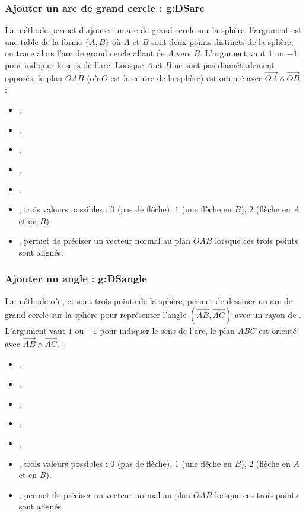 \subsubsection{Ajouter un arc de grand cercle : g:DSarc}

La méthode  permet d'ajouter un arc de grand cercle sur la sphère, l'argument  est une table de la forme $\{A,B\}$ où $A$ et $B$ sont deux points distincts de la sphère, on trace alors l'arc de grand cercle allant de $A$ vers $B$. L'argument  vaut $1$ ou $-1$ pour indiquer le sens de l'arc. Lorsque $A$ et $B$ ne sont pas diamétralement opposés, le plan $OAB$ (où $O$ est le centre de la sphère) est orienté avec $\vec{OA}\wedge\vec{OB}$. \writeoptions :
    \begin{itemize}
        \item {}, 
        \item {},
        \item {},
        \item {},
        \item {},
        \item {}, trois valeurs possibles : $0$ (pas de flèche), $1$ (une flèche en $B$), $2$ (flèche en $A$ et en $B$).
        \item {}, permet de préciser un vecteur normal au plan $OAB$ lorsque ces trois points sont alignés.
    \end{itemize}

\subsubsection{Ajouter un angle : g:DSangle}

La méthode  où ,  et  sont trois points de la sphère, permet de dessiner un arc de grand cercle sur la sphère pour représenter l'angle $(\vec{AB},\vec{AC})$ avec un rayon de . L'argument  vaut $1$ ou $-1$ pour indiquer le sens de l'arc, le plan $ABC$ est orienté avec $\vec{AB}\wedge\vec{AC}$. \writeoptions :
    \begin{itemize}
        \item {}, 
        \item {},
        \item {},
        \item {},
        \item {},
        \item {}, trois valeurs possibles : $0$ (pas de flèche), $1$ (une flèche en $B$), $2$ (flèche en $A$ et en $B$).
        \item {}, permet de préciser un vecteur normal au plan $OAB$ lorsque ces trois points sont alignés.
    \end{itemize}
    
